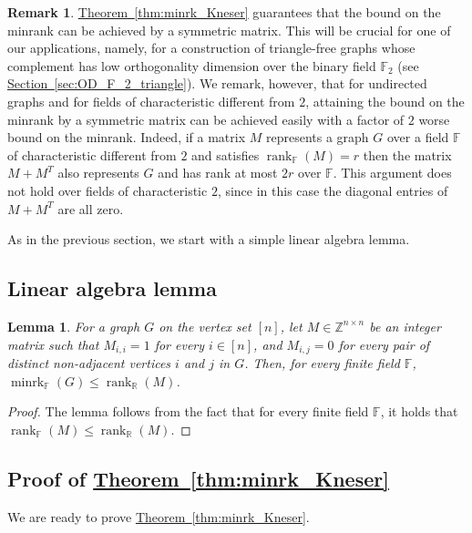 \documentclass[11pt]{article}
\numberwithin{equation}{section}
\newtheorem{lemma}[theorem]{Lemma}
\theoremstyle{definition}
\newtheorem{remark}[theorem]{Remark}
\theoremstyle{plain}
\newcommand{\R}{\mathbb R}
\newcommand{\Z}{\mathbb Z}
\newcommand{\expref}[2]{\hyperref[#2]{#1~\ref{#2}}}
\newcommand{\Fset}{\mathbb{F}}
\newcommand{\rank}{\mathop{\mathrm{rank}}}
\newcommand{\minrank}{\mathop{\mathrm{minrk}}}
\begin{document}
\begin{remark}\label{remark:symmetric}
\expref{Theorem}{thm:minrk_Kneser} guarantees that the bound on the minrank can be achieved by a symmetric matrix.
This will be crucial for one of our applications, namely, for a construction of triangle-free graphs whose complement has low orthogonality dimension over the binary field $\Fset_2$ (see \expref{Section}{sec:OD_F_2_triangle}).
We remark, however, that for undirected graphs and for fields of characteristic different from $2$, attaining the bound on the minrank by a symmetric matrix can be achieved easily with a factor of $2$ worse bound on the minrank. Indeed, if a matrix $M$ represents a graph $G$ over a field $\Fset$ of characteristic different from $2$ and satisfies ${\rank}_{\Fset}(M) = r$ then the matrix $M+M^T$ also represents $G$ and has rank at most $2r$ over $\Fset$.
This argument does not hold over fields of characteristic $2$, since in this case the diagonal entries of $M+M^T$ are all %
zero.  %
\end{remark}

As in the previous section, we start with a simple linear algebra lemma.

\subsection{Linear algebra lemma}

\begin{lemma}\label{lemma:rankp_R}
  For a graph $G$ on the vertex set $[n]$, let $M \in \Z^{n \times n}$ be an integer matrix such that $M_{i,i}=1$ for every $i \in [n]$, and $M_{i,j} = 0$ for every
pair of  %
distinct non-adjacent vertices $i$ and $j$ in $G$. Then, for every finite field $\Fset$, ${\minrank}_{\Fset}(G) \leq \rank_\R(M)$.
\end{lemma}

%
\begin{proof}
The lemma follows from the fact that for every finite field $\Fset$, it holds that $\rank_{\Fset} (M) \leq \rank_{\R} (M)$.
\end{proof}

%
%
%
%
%
%
%
%
%
%
%
%
%
%
%
%
%
%
%
%
%
%
%
%
%
%
%
%
%
%
%

\subsection{Proof of \expref{Theorem}{thm:minrk_Kneser}}

We are ready to prove \expref{Theorem}{thm:minrk_Kneser}.
\end{document}
